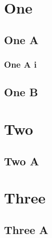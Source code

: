 \section{One}
\label{sec:org0e4d337}
\startcontents[level-1]
\subsection{One A}
\label{sec:org47118c0}
\subsubsection{One A i}
\label{sec:orgaf3ed89}
\subsection{One B}
\label{sec:org1f85fd9}
\stopcontents[level-1]
\section{Two}
\label{sec:org0af2b60}
\tableofcontents
\subsection{Two A}
\label{sec:org3028fdc}
\section{Three}
\label{sec:orgb3336ea}
\setcounter{tocdepth}{2}
\tableofcontents
\subsection{Three A}
\label{sec:org799290e}
